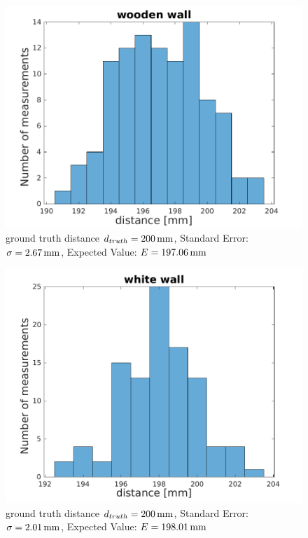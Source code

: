 \begin{figure}
		\centering
		\includegraphics[width=0.9\linewidth]{pictures/wooden_wall.pdf}
		\caption{ground truth distance $d_{truth}= \unit[200]{mm}$, Standard Error: $\sigma=\unit[2.67]{mm}$, Expected Value: $E=\unit[197.06]{mm}$}
		\label{fig:surface_hist_wood}
\end{figure}

\begin{figure}
		\centering
		\includegraphics[width=0.9\linewidth]{pictures/white_wall.pdf}
		\caption{ground truth distance $d_{truth}= \unit[200]{mm}$, Standard Error: $\sigma=\unit[2.01]{mm}$, Expected Value: $E=\unit[198.01]{mm}$}
		\label{fig:surface_hist_white}
\end{figure}


